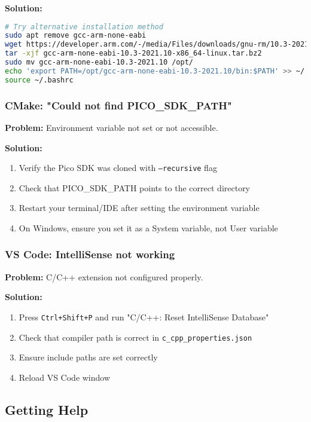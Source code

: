 \documentclass[11pt,a4paper]{article}
\begin{document}
\textbf{Solution:}
\begin{lstlisting}[language=bash]
# Try alternative installation method
sudo apt remove gcc-arm-none-eabi
wget https://developer.arm.com/-/media/Files/downloads/gnu-rm/10.3-2021.10/gcc-arm-none-eabi-10.3-2021.10-x86_64-linux.tar.bz2
tar -xjf gcc-arm-none-eabi-10.3-2021.10-x86_64-linux.tar.bz2
sudo mv gcc-arm-none-eabi-10.3-2021.10 /opt/
echo 'export PATH=/opt/gcc-arm-none-eabi-10.3-2021.10/bin:$PATH' >> ~/.bashrc
source ~/.bashrc
\end{lstlisting}

\subsubsection{CMake: "Could not find PICO\_SDK\_PATH"}
\textbf{Problem:} Environment variable not set or not accessible.

\textbf{Solution:}
\begin{enumerate}
    \item Verify the Pico SDK was cloned with \texttt{--recursive} flag
    \item Check that PICO\_SDK\_PATH points to the correct directory
    \item Restart your terminal/IDE after setting the environment variable
    \item On Windows, ensure you set it as a System variable, not User variable
\end{enumerate}

\subsubsection{VS Code: IntelliSense not working}
\textbf{Problem:} C/C++ extension not configured properly.

\textbf{Solution:}
\begin{enumerate}
    \item Press \texttt{Ctrl+Shift+P} and run "C/C++: Reset IntelliSense Database"
    \item Check that compiler path is correct in \texttt{c\_cpp\_properties.json}
    \item Ensure include paths are set correctly
    \item Reload VS Code window
\end{enumerate}

\subsection{Getting Help}
\end{document}
